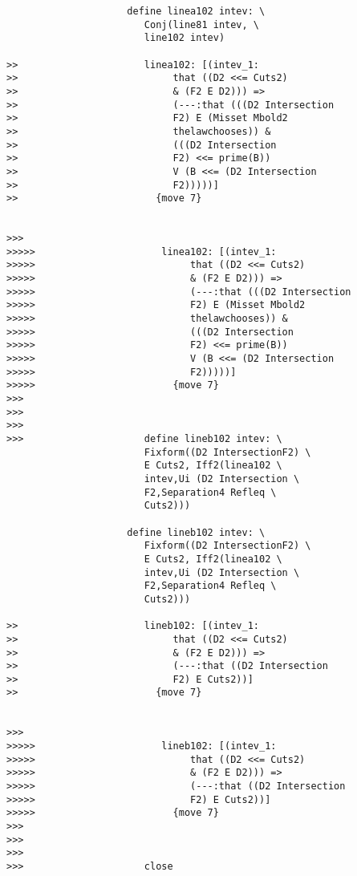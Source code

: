 \documentclass[12pt]{article}
\begin{document}
\begin{verbatim}
                     define linea102 intev: \
                        Conj(line81 intev, \
                        line102 intev)

>>                      linea102: [(intev_1:
>>                           that ((D2 <<= Cuts2)
>>                           & (F2 E D2))) =>
>>                           (---:that (((D2 Intersection
>>                           F2) E (Misset Mbold2
>>                           thelawchooses)) &
>>                           (((D2 Intersection
>>                           F2) <<= prime(B))
>>                           V (B <<= (D2 Intersection
>>                           F2)))))]
>>                        {move 7}


>>>
>>>>>                      linea102: [(intev_1:
>>>>>                           that ((D2 <<= Cuts2)
>>>>>                           & (F2 E D2))) =>
>>>>>                           (---:that (((D2 Intersection
>>>>>                           F2) E (Misset Mbold2
>>>>>                           thelawchooses)) &
>>>>>                           (((D2 Intersection
>>>>>                           F2) <<= prime(B))
>>>>>                           V (B <<= (D2 Intersection
>>>>>                           F2)))))]
>>>>>                        {move 7}
>>>
>>>
>>>
>>>                     define lineb102 intev: \
                        Fixform((D2 IntersectionF2) \
                        E Cuts2, Iff2(linea102 \
                        intev,Ui (D2 Intersection \
                        F2,Separation4 Refleq \
                        Cuts2)))

                     define lineb102 intev: \
                        Fixform((D2 IntersectionF2) \
                        E Cuts2, Iff2(linea102 \
                        intev,Ui (D2 Intersection \
                        F2,Separation4 Refleq \
                        Cuts2)))

>>                      lineb102: [(intev_1:
>>                           that ((D2 <<= Cuts2)
>>                           & (F2 E D2))) =>
>>                           (---:that ((D2 Intersection
>>                           F2) E Cuts2))]
>>                        {move 7}


>>>
>>>>>                      lineb102: [(intev_1:
>>>>>                           that ((D2 <<= Cuts2)
>>>>>                           & (F2 E D2))) =>
>>>>>                           (---:that ((D2 Intersection
>>>>>                           F2) E Cuts2))]
>>>>>                        {move 7}
>>>
>>>
>>>
>>>                     close


\end{verbatim}
\end{document}
